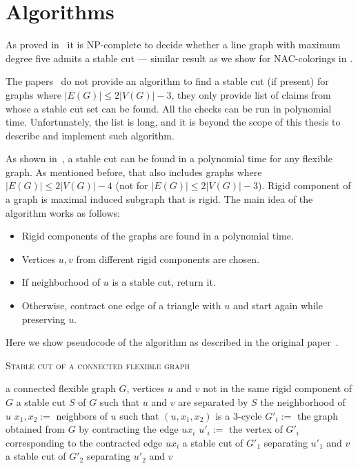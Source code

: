 \section{Algorithms}

As proved in~\cite{stable_cuts_complexity} it is NP-complete
to decide whether a line graph with maximum degree five admits a stable cut
--- similar result as we show for NAC-colorings in .

The papers~\cite{stable_cuts_2v_3,stable_cuts_2v_3_revisit} do not provide
an algorithm to find a stable cut (if present)
for graphs where \(|E(G)| \le 2|V(G)|-3 \),
they only provide list of claims
from whose a stable cut set can be found.
All the checks can be run in polynomial time.
Unfortunately, the list is long,
and it is beyond the scope of this thesis
to describe and implement such algorithm.

As shown in~\cite[Algorithm 1]{stable_cuts_legersky}, a stable cut can be found
in a polynomial time for any flexible graph.
As mentioned before, that also includes graphs
where \( |E(G)| \le 2|V(G)| - 4 \) (not for \( |E(G)| \le 2|V(G)| - 3 \)).
Rigid component of a graph is maximal induced subgraph that is rigid.
The main idea of the algorithm works as follows:
%
\begin{itemize}
	\item Rigid components of the graphs are found in a polynomial time.
	\item Vertices \( u, v \) from different rigid components are chosen.
	\item If neighborhood of \( u \) is a stable cut, return it.
	\item Otherwise, contract one edge of a triangle with \( u \) and start again while preserving \( u \).
\end{itemize}

Here we show pseudocode of the algorithm as described
in the original paper~\cite{stable_cuts_legersky}.
%
\begin{algorithm}[ht]
	\caption{\textsc{Stable cut of a connected flexible graph}}%
	\label{alg:stableCutFlexible}%
	\begin{algorithmic}[1]
		\Require{} a connected flexible graph $G$, vertices $u$ and $v$ not in the same rigid component of $G$
		\Ensure{} a stable cut $S$ of $G$ such that $u$ and $v$ are separated by $S$
		\State\Return{} the neighborhood of $u$
		\Else{}
		\State{} $x_1,x_2 :={}$ neighbors of $u$ such that $(u,x_1,x_2)$  is a $3$-cycle
		\State{} $G'_i :={}$ the graph obtained from $G$ by contracting the edge $ux_i$
		\State{} $u'_i :={}$ the vertex of $G'_i$ corresponding to the contracted edge $ux_i$
		\EndFor{}
		\State\Return{} a stable cut of $G'_1$ separating $u'_1$ and $v$
		\Else{}
		\State\Return{} a stable cut of $G'_2$ separating $u'_2$ and $v$
		\EndIf{}
		\EndIf{}
	\end{algorithmic}
\end{algorithm}
%

